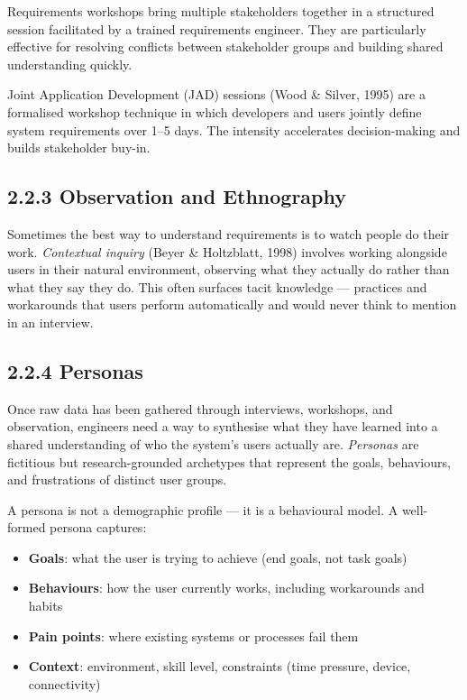 \documentclass[11pt,a4paper]{book}
\begin{document}
Requirements workshops bring multiple stakeholders together in a structured session facilitated by a trained requirements engineer. They are particularly effective for resolving conflicts between stakeholder groups and building shared understanding quickly.

Joint Application Development (JAD) sessions (Wood \& Silver, 1995) are a formalised workshop technique in which developers and users jointly define system requirements over 1--5 days. The intensity accelerates decision-making and builds stakeholder buy-in.

\subsection{2.2.3 Observation and Ethnography}

Sometimes the best way to understand requirements is to watch people do their work. \textit{Contextual inquiry} (Beyer \& Holtzblatt, 1998) involves working alongside users in their natural environment, observing what they actually do rather than what they say they do. This often surfaces tacit knowledge --- practices and workarounds that users perform automatically and would never think to mention in an interview.

\subsection{2.2.4 Personas}

Once raw data has been gathered through interviews, workshops, and observation, engineers need a way to synthesise what they have learned into a shared understanding of who the system's users actually are. \textit{Personas} are fictitious but research-grounded archetypes that represent the goals, behaviours, and frustrations of distinct user groups.

A persona is not a demographic profile --- it is a behavioural model. A well-formed persona captures:

\begin{itemize}
  \item \textbf{Goals}: what the user is trying to achieve (end goals, not task goals)
  \item \textbf{Behaviours}: how the user currently works, including workarounds and habits
  \item \textbf{Pain points}: where existing systems or processes fail them
  \item \textbf{Context}: environment, skill level, constraints (time pressure, device, connectivity)
\end{itemize}
\end{document}
